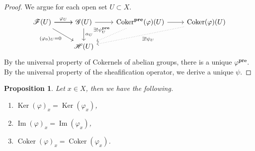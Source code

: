 \documentclass{article}
\newtheorem{proposition}{Proposition}[section]
\numberwithin{equation}{section}
\DeclareMathOperator{\Ker}{Ker}
\DeclareMathOperator{\Image}{Im}
\DeclareMathOperator{\Coker}{Coker}
\begin{document}
\begin{proof}
We argue for each open set $U\subset X$. 
\[
\begin{tikzcd}
\mathcal{F}(U) \arrow[r, "\varphi_U"] \arrow[r] \arrow[rd, "(\varphi_0)_U=0"'] & \mathcal{G}(U) \arrow[r] \arrow[d,"\alpha_U"] & \Coker^{\mathbf{pre}}(\varphi)(U) \arrow[ld, "\exists!\psi^{\mathbf{pre}}_U"', dotted] \arrow[r]& \Coker(\varphi)(U) \arrow[lld, "\exists!\psi_U", dotted] \\
                                                                    & \mathcal{H}(U)                     &                                                                                   &                                                    
\end{tikzcd}
\]
By the universal property of Cokernels of abelian groups, there is a unique $\varphi^{\mathbf{pre}}$. By the universal property of the sheafification operator, we derive a unique $\psi$.
\end{proof}

\begin{proposition}
Let $x\in X$, then we have the following.
\begin{enumerate}[1).]
\item $\Ker(\varphi)_x=\Ker(\varphi_x)$,
\item $\Image(\varphi)_x=\Image(\varphi_x)$,
\item $\Coker(\varphi)_x=\Coker(\varphi_x)$.
\end{enumerate}
\end{proposition}
\end{document}
